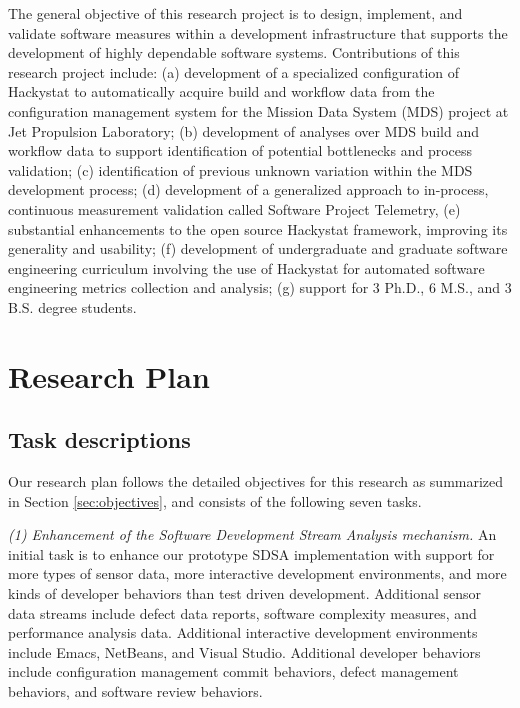 \medskip

The general objective of this research project is to design, implement, and
validate software measures within a development infrastructure that
supports the development of highly dependable software systems.
Contributions of this research project include: (a) development of a
specialized configuration of Hackystat to automatically acquire build and
workflow data from the configuration management system for the Mission Data
System (MDS) project at Jet Propulsion Laboratory; (b) development of
analyses over MDS build and workflow data to support identification of
potential bottlenecks and process validation; (c) identification of
previous unknown variation within the MDS development process; (d)
development of a generalized approach to in-process, continuous measurement
validation called Software Project Telemetry, (e) substantial
enhancements to the open source Hackystat framework, improving its
generality and usability; (f) development of undergraduate and graduate
software engineering curriculum involving the use of Hackystat for
automated software engineering metrics collection and analysis; (g) support
for 3 Ph.D., 6 M.S., and 3 B.S. degree students. 

\section{Research Plan}
\label{sec:research-plan}

\subsection{Task descriptions}


Our research plan follows the detailed objectives for this research as
summarized in Section \ref{sec:objectives}, and consists of the following
seven tasks.

{\em (1) Enhancement of the Software Development Stream Analysis
mechanism.}  An initial task is to enhance our prototype SDSA
implementation with support for more types of sensor data, more interactive
development environments, and more kinds of developer
behaviors than test driven development.  Additional sensor data streams
include defect data reports, software complexity measures, and performance
analysis data.  Additional interactive development environments include
Emacs, NetBeans, and Visual Studio.  Additional developer behaviors include
configuration management commit behaviors, defect management behaviors, and
software review behaviors.  

